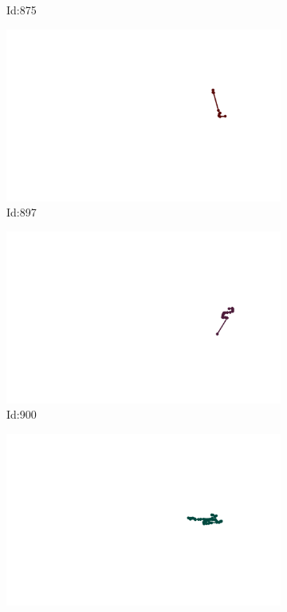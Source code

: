 \documentclass[12pt,twoside]{report}
\begin{document}
\begin{figure}
\begin{subfigure}[b]{0.20\textwidth}
\caption{Id:875}
\end{subfigure}
\begin{subfigure}[b]{0.20\textwidth}
\centering
\includegraphics[width=\textwidth]{../trajectories/897.png}
\caption{Id:897}
\end{subfigure}
\begin{subfigure}[b]{0.20\textwidth}
\centering
\includegraphics[width=\textwidth]{../trajectories/900.png}
\caption{Id:900}
\end{subfigure}
\begin{subfigure}[b]{0.20\textwidth}
\centering
\includegraphics[width=\textwidth]{../trajectories/902.png}

\end{subfigure}
\end{figure}
\end{document}
